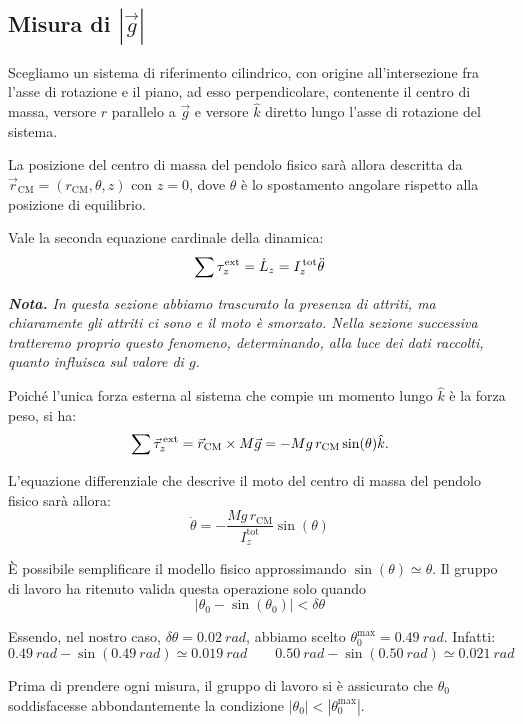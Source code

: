\documentclass{article}
\begin{document}
\subsection{Misura di $\left|\vec{g}\right|$}

Scegliamo un sistema di riferimento cilindrico, con
origine all'intersezione fra l'asse di rotazione e il piano,
ad esso perpendicolare, contenente il centro di massa, versore $\hat{r}$
parallelo a $\vec{g}$ e versore $\hat{k}$ diretto lungo l'asse di
rotazione del sistema.

La posizione del centro di massa del pendolo fisico sarà allora descritta
da $\vec{r}_\text{CM} = (r_\text{CM},\theta,z)$ con $z=0$, dove $\theta$
è lo spostamento angolare rispetto alla posizione di equilibrio.

Vale la seconda equazione cardinale della dinamica:
\[\sum\tau^\text{ext}_z = \dot{L}_z = I_z^\text{\,tot} \ddot{\theta}\]

\vspace{2mm}
\emph{
  \textbf{Nota.} In questa sezione abbiamo trascurato la presenza di
  attriti, ma chiaramente gli attriti ci sono e il moto è smorzato.
  Nella sezione successiva tratteremo proprio questo fenomeno,
  determinando, alla luce dei dati raccolti, quanto influisca
  sul valore di $g$.
}
\vspace{2mm}

Poiché l'unica forza esterna al sistema che compie un momento lungo
$\hat{k}$ è la forza peso, si ha:
\[
  \sum\vec{\tau}^\text{\,ext}_z =
  \vec{r}_\text{CM}\times M\vec{g} = -Mg\,r_\text{CM}\sin(\theta)\hat{k}.
\]

L'equazione differenziale che descrive il moto del centro di massa
del pendolo fisico sarà allora:
\[ \ddot{\theta} = -\frac{Mg\,r_\text{CM}}{I_z^\text{tot}}\sin(\theta) \]

È possibile semplificare il modello fisico approssimando
$\sin(\theta)\simeq\theta$. Il gruppo di lavoro ha ritenuto
valida questa operazione solo quando
\[\left|\theta_0-\sin(\theta_0)\right| < \delta\theta\]

Essendo, nel nostro caso, $\delta\theta=\qty{0.02}{rad}$, abbiamo scelto
$\theta_0^\text{max} = \qty{0.49}{rad}$. Infatti:
\[
  \qty{0.49}{rad} - \sin(\qty{0.49}{rad}) \simeq \qty{0.019}{rad}
  \qquad
  \qty{0.50}{rad} - \sin(\qty{0.50}{rad}) \simeq \qty{0.021}{rad}
\]

Prima di prendere ogni misura, il gruppo di lavoro si è assicurato
che $\theta_0$ soddisfacesse abbondantemente la condizione
$|\theta_0|<\left|\theta_0^\text{max}\right|$.
\end{document}

